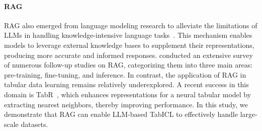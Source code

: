\paragraph{RAG}
RAG also emerged from language modeling research to alleviate the limitations of LLMs in handling knowledge-intensive language tasks~\citep{lewis2020RAG}.
This mechanism enables models to leverage external knowledge bases to supplement their representations, producing more accurate and informed responses.
\cite{gao2023SurveyRAG} conducted an extensive survey of numerous follow-up studies on RAG, categorizing them into three main areas: pre-training, fine-tuning, and inference.
In contrast, the application of RAG in tabular data learning remains relatively underexplored.
A recent success in this domain is TabR~\citep{gorishniy2024TabR}, which enhances representations for a neural tabular model by extracting nearest neighbors, thereby improving performance.
In this study, we demonstrate that RAG can enable LLM-based TabICL to effectively handle large-scale datasets.




